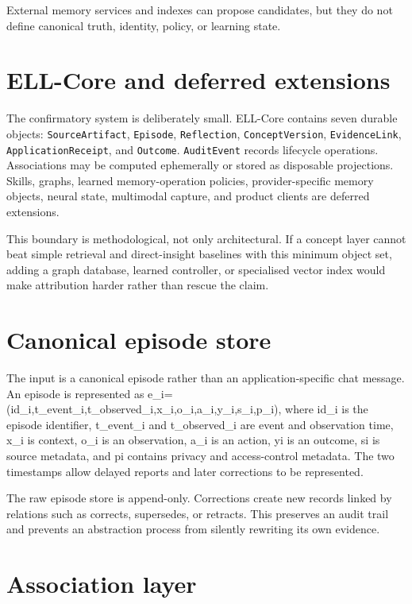 \documentclass[
  english,
  a4paper,
  DIV=11,
  numbers=noendperiod]{scrreprt}
\begin{document}
External memory services and indexes can propose candidates, but they do
not define canonical truth, identity, policy, or learning state.

\section{ELL-Core and deferred
extensions}\label{ell-core-and-deferred-extensions}

The confirmatory system is deliberately small. ELL-Core contains seven
durable objects: \texttt{SourceArtifact}, \texttt{Episode},
\texttt{Reflection}, \texttt{ConceptVersion}, \texttt{EvidenceLink},
\texttt{ApplicationReceipt}, and \texttt{Outcome}. \texttt{AuditEvent}
records lifecycle operations. Associations may be computed ephemerally
or stored as disposable projections. Skills, graphs, learned
memory-operation policies, provider-specific memory objects, neural
state, multimodal capture, and product clients are deferred extensions.

This boundary is methodological, not only architectural. If a concept
layer cannot beat simple retrieval and direct-insight baselines with
this minimum object set, adding a graph database, learned controller, or
specialised vector index would make attribution harder rather than
rescue the claim.

\section{Canonical episode store}\label{canonical-episode-store}

The input is a canonical episode rather than an application-specific
chat message. An episode is represented as
e\_i=(id\_i,t\_event\_i,t\_observed\_i,x\_i,o\_i,a\_i,y\_i,s\_i,p\_i),
where id\_i is the episode identifier, t\_event\_i and t\_observed\_i
are event and observation time, x\_i is context, o\_i is an observation,
a\_i is an action, yi is an outcome, si is source metadata, and pi
contains privacy and access-control metadata. The two timestamps allow
delayed reports and later corrections to be represented.

The raw episode store is append-only. Corrections create new records
linked by relations such as corrects, supersedes, or retracts. This
preserves an audit trail and prevents an abstraction process from
silently rewriting its own evidence.

\section{Association layer}\label{association-layer}
\end{document}
